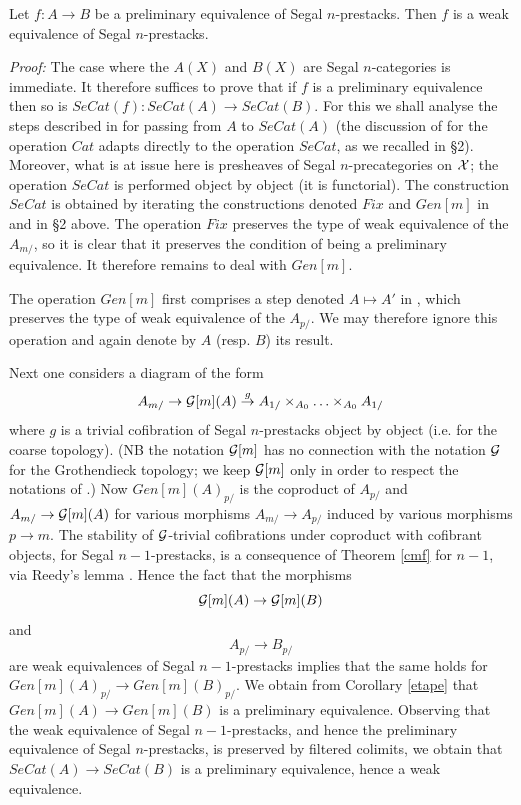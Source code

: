 \begin{lemma}
\label{etape2}
Let $f: A\rightarrow B$ be a preliminary equivalence of Segal
$n$-prestacks.
Then $f$ is a weak equivalence of Segal $n$-prestacks.
\end{lemma}
{\em Proof:}
The case where the $A(X)$ and $B(X)$ are
Segal $n$-categories is immediate. It
therefore suffices to prove that if $f$ is a preliminary equivalence then
so is $SeCat(f): SeCat(A)\rightarrow SeCat(B)$. For this we shall
analyse the steps described in \cite{nCAT} for passing from $A$ to
$SeCat(A)$ (the discussion of \cite{nCAT} for the operation $Cat$ adapts
directly to the operation $SeCat$, as we recalled in \S 2).
Moreover, what is at issue here
is presheaves of Segal $n$-precategories on ${\cal X}$;
the operation $SeCat$ is performed object by object (it is functorial). The
construction $SeCat$ is obtained by iterating the constructions denoted
$Fix$ and
$Gen[m]$ in \cite{nCAT} and in \S 2 above.
The operation $Fix$ preserves the
type of weak equivalence of the $A_{m/}$, so it is clear that it
preserves the condition
of being a
preliminary equivalence. It therefore remains to deal with $Gen[m]$.

The operation $Gen[m]$ first comprises a step denoted $A\mapsto A'$ in
\cite{nCAT}, which preserves the type of weak equivalence of the $A_{p/}$. We
may therefore ignore this operation and again denote by $A$ (resp. $B$) its
result.

Next one considers a diagram of the form
$$
A_{m/} \rightarrow {\cal G} [m](A) \stackrel{g}{\rightarrow }
A_{1/}\times _{A_0} \ldots \times _{A_0} A_{1/}
$$
where $g$ is a trivial cofibration of Segal $n$-prestacks
object by object (i.e. for the coarse topology). (NB the notation
${\cal G} [m]$ has no connection with the notation ${\cal G}$ for the Grothendieck
topology; we keep ${\cal G} [m]$ only in order to respect the
notations of \cite{nCAT}.) Now $Gen[m](A)_{p/}$ is the coproduct of
$A_{p/}$ and $A_{m/}\rightarrow {\cal G} [m](A)$ for various morphisms
$A_{m/}\rightarrow A_{p/}$ induced by various morphisms $p\rightarrow
m$.
The stability of ${\cal G}$-trivial cofibrations under
coproduct with cofibrant objects, for Segal $n-1$-prestacks,
is a
consequence of Theorem \ref{cmf} for $n-1$, via Reedy's lemma
\cite{Reedy}.
Hence the fact that the morphisms
$$
{\cal G} [m](A)\rightarrow {\cal G} [m](B)
$$
and
$$
A_{p/} \rightarrow B_{p/}
$$
are weak equivalences of Segal $n-1$-prestacks implies
that the same holds
for $Gen[m](A)_{p/}\rightarrow Gen[m](B)_{p/}$. We obtain from
Corollary \ref{etape} that $Gen[m](A)\rightarrow Gen[m](B)$ is a
preliminary equivalence. Observing that the weak equivalence of
Segal $n-1$-prestacks, and hence the preliminary equivalence of
Segal $n$-prestacks, is preserved by filtered colimits,
we obtain that
$SeCat(A)\rightarrow SeCat(B)$ is a preliminary equivalence,
hence a
weak equivalence.
\eop

